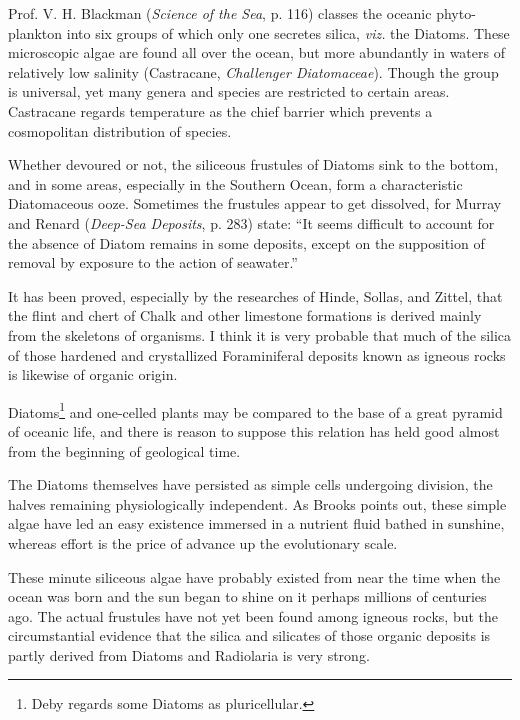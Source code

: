 \documentclass[a4paper, 12pt, oneside]{article}
\begin{document}
Prof. V. H. Blackman (\emph{Science of the Sea}, p. 116) classes the oceanic phyto-plankton into six groups of which only one secretes silica, \emph{viz.} the Diatoms. These microscopic algae are found all over the ocean, but more abundantly in waters of relatively low salinity (Castracane, \emph{Challenger Diatomaceae}). Though the group is universal, yet many genera and species are restricted to certain areas. Castracane regards temperature as the chief barrier which prevents a cosmopolitan distribution of species.

Whether devoured or not, the siliceous frustules of Diatoms sink to the bottom, and in some areas, especially in the Southern Ocean, form a characteristic Diatomaceous ooze. Sometimes the frustules appear to get dissolved, for Murray and Renard (\emph{Deep-Sea Deposits}, p. 283) state: ``It seems difficult to account for the absence of Diatom remains in some deposits, except on the supposition of removal by exposure to the action of seawater.''

It has been proved, especially by the researches of Hinde, Sollas, and Zittel, that the flint and chert of Chalk and other limestone formations is derived mainly from the skeletons of organisms. I think it is very probable that much of the silica of those hardened and crystallized Foraminiferal deposits known as igneous rocks is likewise of organic origin.

Diatoms\footnote{Deby regards some Diatoms as pluricellular.} and one-celled plants may be compared to the base of a great pyramid of oceanic life, and there is reason to suppose this relation has held good almost from the beginning of geological time.

The Diatoms themselves have persisted as simple cells undergoing division, the halves remaining physiologically independent. As Brooks points out, these simple algae have led an easy existence immersed in a nutrient fluid bathed in sunshine, whereas effort is the price of advance up the evolutionary scale.

These minute siliceous algae have probably existed from near the time when the ocean was born and the sun began to shine on it perhaps millions of centuries ago. The actual frustules have not yet been found among igneous rocks, but the circumstantial evidence that the silica and silicates of those organic deposits is partly derived from Diatoms and Radiolaria is very strong.
\end{document}
